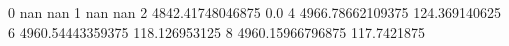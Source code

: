 0 nan nan
1 nan nan
2 4842.41748046875 0.0
4 4966.78662109375 124.369140625
6 4960.54443359375 118.126953125
8 4960.15966796875 117.7421875
